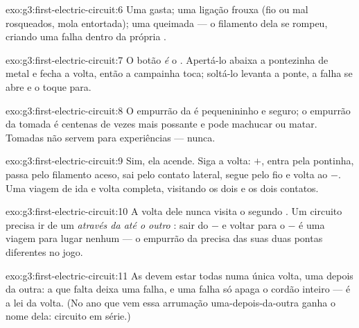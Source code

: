 \begin{solution}{exo:g3:first-electric-circuit:6}
Uma  gasta; uma ligação frouxa (fio ou  mal rosqueados,
mola entortada); uma  queimada --- o filamento dela se
rompeu, criando uma falha dentro da própria .
\end{solution}

\begin{solution}{exo:g3:first-electric-circuit:7}
O botão \emph{é} o . Apertá-lo abaixa a pontezinha de
metal e fecha a volta, então a campainha toca; soltá-lo levanta a
ponte, a falha se abre e o toque para.
\end{solution}

\begin{solution}{exo:g3:first-electric-circuit:8}
O empurrão da  é pequenininho e seguro; o empurrão da tomada é
centenas de vezes mais possante e pode machucar ou matar. Tomadas não
servem para experiências --- nunca.
\end{solution}

\begin{solution}{exo:g3:first-electric-circuit:9}
Sim, ela acende. Siga a volta:  $+$, entra pela pontinha,
passa pelo filamento aceso, sai pelo contato lateral, segue pelo fio
e volta ao $-$. Uma viagem de ida e volta completa, visitando os dois
 e os dois contatos.
\end{solution}

\begin{solution}{exo:g3:first-electric-circuit:10}
A volta dele nunca visita o segundo . Um circuito precisa ir
de um  \emph{através da  até o outro} : sair
do $-$ e voltar para o $-$ é uma viagem para lugar nenhum --- o
empurrão da  precisa das suas duas pontas diferentes no jogo.
\end{solution}

\begin{solution}{exo:g3:first-electric-circuit:11}
As  devem estar todas numa única volta, uma depois da outra:
a  que falta deixa uma falha, e uma falha só apaga o cordão
inteiro --- é a lei da volta. (No ano que vem essa arrumação
uma-depois-da-outra ganha o nome dela: circuito em série.)
\end{solution}

